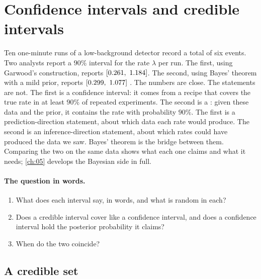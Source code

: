 \section{Confidence intervals and credible intervals}
\label{4b:sec:credible}

Ten one-minute runs of a low-background detector record a total of six
events. Two analysts report a $90\%$ interval for the rate $\lambda$ per run.
The first, using Garwood's construction, reports $[0.261,\
1.184]$. The second, using Bayes' theorem with a mild prior, reports
$[\FourBCrCredLo,\ \FourBCrCredHi]$ .
The numbers are close. The statements are not. The first is a confidence
interval: it comes from a recipe that covers the true rate in at least $90\%$ of
repeated experiments. The second is a \newterm{credible interval}: given these
data and the prior, it contains the rate with probability $90\%$. The first is
a prediction-direction statement, about which data each rate would produce. The
second is an inference-direction statement, about which rates could have
produced the data we saw. Bayes' theorem is the bridge between them. Comparing
the two on the same data shows what each one claims and what it needs;
\cref{ch:05} develops the Bayesian side in full.

\paragraph{The question in words.}
\begin{enumerate}[label=\arabic*.]
  \item What does each interval say, in words, and what is random in each?
  \item Does a credible interval cover like a confidence interval, and does a
        confidence interval hold the posterior probability it claims?
  \item When do the two coincide?
\end{enumerate}

\subsection{A credible set}
\label{4b:sec:credible-def}

